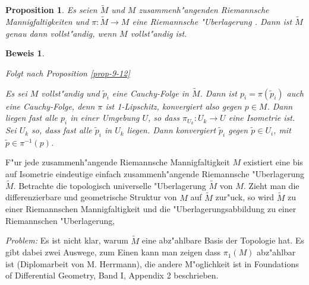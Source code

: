 \documentclass[paper=A4, twoside, chapterprefix=true, bibliography=totoc, headsepline]{scrbook}
\theoremstyle{plain}
\newtheorem{Prop}[Dfn]{Proposition}
\theoremstyle{nonumberplain}
\newtheorem{bew}{Beweis}
\theoremstyle{empty}
\theoremstyle{break}
\newcommand{\quot}[1]{\textrm{\glqq}{#1}\textrm{\grqq}}
\begin{document}
\begin{Prop}
  Es seien $\tilde M$ und $M$ zusammenh"angenden Riemannsche Mannigfaltigkeiten und $\pi: \tilde M \to M$ eine Riemannsche "Uberlagerung . Dann ist $\tilde M$ genau dann vollst"andig, wenn $M$ vollst"andig ist.
\end{Prop}

\begin{bew}\begin{description}[font=\normalfont]
  \item[\quot{$\Rightarrow$}:]
    Folgt nach Proposition \ref{prop-9-12}
  \item[\quot{$\Leftarrow$}:]
    Es sei $M$ vollst"andig und $\tilde p_i$ eine Cauchy-Folge in $\tilde M$.
    Dann ist $p_i = \pi(\tilde p_i)$ auch eine Cauchy-Folge, denn $\pi$ ist 1-Lipschitz, konvergiert also gegen $p \in M$.
    Dann liegen fast alle $p_i$ in einer Umgebung $U$, so dass $\pi_{U_k}: U_k \to U$ eine Isometrie ist.
    Sei $U_k$ so, dass fast alle $\tilde p_i$ in $U_k$ liegen.
    Dann konvergiert $\tilde p_i$ gegen $\tilde p \in U_i$, mit $\tilde p \in \pi^{-1}(p)$.
  \end{description}\end{bew}

F"ur jede zusammenh"angende Riemannsche Mannigfaltigkeit $M$ existiert eine bis auf Isometrie eindeutige einfach zusammenh"angende Riemannsche "Uberlagerung $\tilde M$.
Betrachte die topologisch universelle "Uberlagerung $\tilde M$ von $M$.
Zieht man die differenzierbare und geometrische Struktur von $M$ auf $\tilde M$ zur"uck, so wird $\tilde M$ zu einer Riemannschen Mannigfaltigkeit und die "Uberlagerungsabbildung zu einer Riemannschen "Uberlagerung,

\emph{Problem:} Es ist nicht klar, warum $\tilde M$ eine abz"ahlbare Basis der Topologie hat.
Es gibt dabei zwei Auswege, zum Einen kann man zeigen dass $\pi_1(M)$ abz"ahlbar ist (Diplomarbeit von M. Herrmann), die andere M"oglichkeit ist in \quot{Foundations of Differential Geometry}, Band I, Appendix 2 \cite{kobayashi-nomizu1963foundations-diffgeo} beschrieben.
\end{document}

